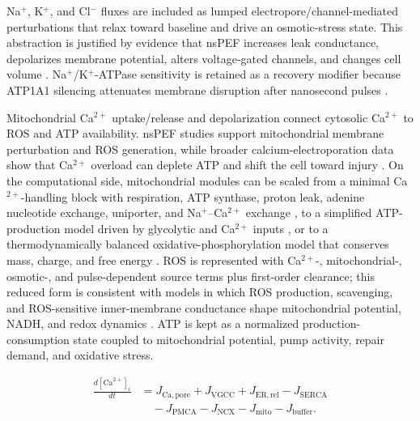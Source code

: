 \documentclass[Afour,sagev,times]{sagej}
\begin{document}
Na$^+$, K$^+$, and Cl$^-$ fluxes are included as lumped electropore/channel-mediated perturbations that relax toward baseline and drive an osmotic-stress state. This abstraction is justified by evidence that nsPEF increases leak conductance, depolarizes membrane potential, alters voltage-gated channels, and changes cell volume \cite{pakhomov2007membrane,smith2011transmembrane,burke2017nanosecond,yang2021regulation}. Na$^+$/K$^+$-ATPase sensitivity is retained as a recovery modifier because ATP1A1 silencing attenuates membrane disruption after nanosecond pulses \cite{silkuniene2023silencing}.

Mitochondrial Ca$^{2+}$ uptake/release and depolarization connect cytosolic Ca$^{2+}$ to ROS and ATP availability. nsPEF studies support mitochondrial membrane perturbation and ROS generation, while broader calcium-electroporation data show that Ca$^{2+}$ overload can deplete ATP and shift the cell toward injury \cite{beebe2012transient,napotnik2012mitochondrial,pakhomova2012oxidative,nuccitelli2013reactive,radzeviciute2024calcium,gibot2020calcium}. On the computational side, mitochondrial modules can be scaled from a minimal Ca$^{2+}$-handling block with respiration, ATP synthase, proton leak, adenine nucleotide exchange, uniporter, and Na$^+$--Ca$^{2+}$ exchange \cite{magnus1997minimal}, to a simplified ATP-production model driven by glycolytic and Ca$^{2+}$ inputs \cite{bertram2006simplified}, or to a thermodynamically balanced oxidative-phosphorylation model that conserves mass, charge, and free energy \cite{beard2005biophysical}. ROS is represented with Ca$^{2+}$-, mitochondrial-, osmotic-, and pulse-dependent source terms plus first-order clearance; this reduced form is consistent with models in which ROS production, scavenging, and ROS-sensitive inner-membrane conductance shape mitochondrial potential, NADH, and redox dynamics \cite{cortassa2004mitochondrial,murphy2016mitochondrial,zhang2022crosstalk}. ATP is kept as a normalized production-consumption state coupled to mitochondrial potential, pump activity, repair demand, and oxidative stress.

\begin{equation}
\begin{aligned}
\frac{d[\mathrm{Ca}^{2+}]_i}{dt} &=
J_{\mathrm{Ca,pore}} + J_{\mathrm{VGCC}} + J_{\mathrm{ER,rel}} - J_{\mathrm{SERCA}} \\
&\quad - J_{\mathrm{PMCA}} - J_{\mathrm{NCX}} - J_{\mathrm{mito}} - J_{\mathrm{buffer}} .
\end{aligned}
\end{equation}
\end{document}
